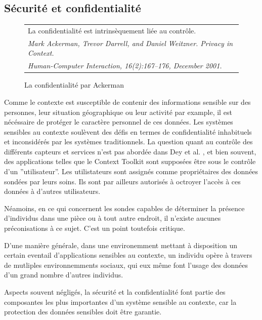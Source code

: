 \subsection{Sécurité et confidentialité}

\begin{figure}[h]
  \centering
  \begin{tabular}{l}
    La confidentialité est intrinsèquement liée au contrôle.
    \cite{ackerman_privacy_2001} \\
    \em \footnotesize Mark Ackerman, Trevor Darrell, and Daniel Weitzner. 
    Privacy in Context. \\
    \em \footnotesize Human-Computer Interaction, 16(2):167–176, December 2001.
    \\
  \end{tabular}
  \caption{La confidentialité par Ackerman}
  \label{fig:quote}
\end{figure}


Comme le contexte est susceptible de contenir des informations sensible sur des
personnes, leur situation géographique ou leur activité par example, il est
nécéssaire de protéger le caractère personnel de ces données. Les systèmes
sensibles au contexte soulèvent des défis en termes de confidentialité
inhabituels et inconsidérés par les systèmes traditionnels. La question quant au
contrôle des différents capteurs et services n'est pas abordée dans Dey et al.
\cite{dey_conceptual_2001}, et bien souvent, des applications telles que le
Context Toolkit sont supposées être sous le contrôle d'un ''utilisateur''. Les
utilistateurs sont assignés comme propriétaires des données sondées par leurs
soins. Ils sont par ailleurs autorisés à octroyer l'accès à ces données à
d'autres utilisateurs.

Néamoins, en ce qui concernent les sondes capables de déterminer la présence
d'individus dans une pièce ou à tout autre endroit, il n'existe aucunes
préconisations à ce sujet. C'est un point toutefois critique.

D'une manière générale, dans une environemment mettant à
disposition un certain eventail d'applications sensibles au contexte, un individu opère
à travers de mutliples environnemments sociaux, qui eux même font l'usage des
données d'un grand nombre d'autres individus.

Aspects souvent négligés, la sécurité et la confidentialité font partie des
composantes les plus importantes d'un système sensible au contexte, car la
protection des données sensibles doit être garantie.

